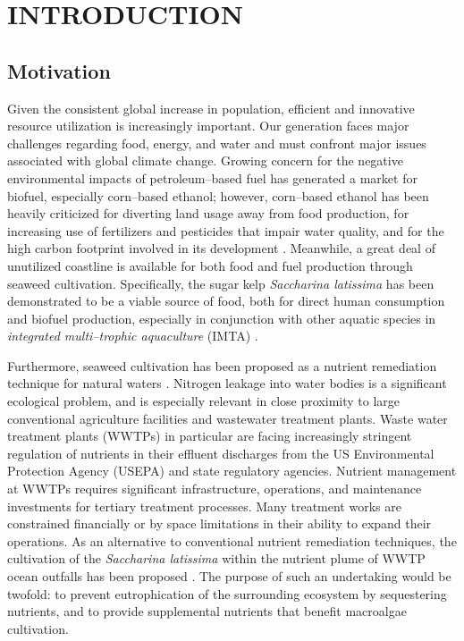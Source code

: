 \chapter{INTRODUCTION} \label{chap:introduction}

\section{Motivation}
  Given the consistent global increase in population, efficient and innovative resource utilization is increasingly important.
Our generation faces major challenges regarding food, energy, and water and must confront major issues associated with global climate change.
Growing concern for the negative environmental impacts of petroleum--based fuel has generated a market for biofuel, especially corn--based ethanol;
however, corn--based ethanol has been heavily criticized for diverting land usage away from food production, for increasing use of fertilizers and pesticides that impair water quality, and for the high carbon footprint involved in its development \cite{jones_corn-based_2015}.
Meanwhile, a great deal of unutilized coastline is available for both food and fuel production through seaweed cultivation.
Specifically, the sugar kelp \textit{Saccharina latissima} has been demonstrated to be a viable source of food, both for direct human consumption and biofuel production, especially in conjunction with other aquatic species in \textit{integrated multi--trophic aquaculture} (IMTA) \cite{brzeski_integrated_1996,chopin_integrating_2001,hadley_modeling_2015,handa_seasonal_2013}.

Furthermore, seaweed cultivation has been proposed as a nutrient remediation technique for natural waters \cite{kim_field_2014}.
Nitrogen leakage into water bodies is a significant ecological problem, and is especially relevant in close proximity to large conventional agriculture facilities and wastewater treatment plants.
Waste water treatment plants (WWTPs) in particular are facing increasingly stringent regulation of nutrients in their effluent discharges from the US Environmental Protection Agency (USEPA) and state regulatory agencies.
Nutrient management at WWTPs requires significant infrastructure, operations, and maintenance investments for tertiary treatment processes. Many treatment works are constrained financially or by space limitations in their ability to expand their operations.
As an alternative to conventional nutrient remediation techniques, the cultivation of the \textit{Saccharina latissima} within the nutrient plume of WWTP ocean outfalls has been proposed \cite{yang_kelp_2015}.
The purpose of such an undertaking would be twofold: to prevent eutrophication of the surrounding ecosystem by sequestering nutrients, and to provide supplemental nutrients that benefit macroalgae cultivation.

